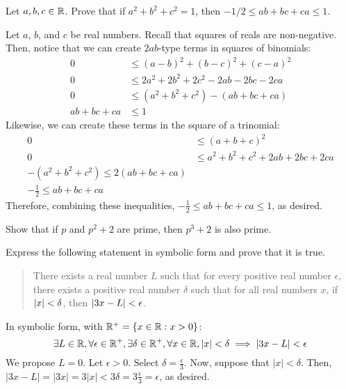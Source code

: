 \begin{challenge}
  Let $a,b,c\in\mathbb{R}$.
  Prove that if $a^2 + b^2 + c^2 = 1$, then $-1/2 \leq ab+bc+ca \leq 1$.
\end{challenge}
\begin{prf}
  Let $a$, $b$, and $c$ be real numbers.
  Recall that squares of reals are non-negative.
  Then, notice that we can create $2ab$-type terms in squares of binomials:
  \begin{align*}
    0            & \leq (a-b)^2 + (b-c)^2 + (c-a)^2          \\
    0            & \leq 2a^2 + 2b^2 + 2c^2 - 2ab - 2bc - 2ca \\
    0            & \leq (a^2 + b^2 + c^2) - (ab + bc + ca)   \\
    ab + bc + ca & \leq 1
  \end{align*}
  Likewise, we can create these terms in the square of a trinomial:
  \begin{align*}
    0 & \leq (a+b+c)^2                         \\
    0 & \leq a^2 + b^2 + c^2 + 2ab + 2bc + 2ca \\
    -(a^2 + b^2 + c^2) \leq 2(ab + bc + ca)    \\
    -\frac{1}{2} \leq ab + bc + ca
  \end{align*}
  Therefore, combining these inequalities, $-\frac{1}{2} \leq ab + bc + ca \leq 1$, as desired.
\end{prf}

\begin{challenge}
  Show that if $p$ and $p^2+2$ are prime, then $p^3+2$ is also prime.
\end{challenge}

\begin{challenge}
  Express the following statement in symbolic form and prove that it is true.
  \begin{quote}
    There exists a real number $L$ such that for every positive real number $\epsilon$,
    there exists a positive real number $\delta$ such that for all real numbers $x$,
    if $\abs{x} < \delta$, then $\abs{3x-L} < \epsilon$.
  \end{quote}
\end{challenge}
\begin{prf}
  In symbolic form, with $\mathbb{R}^+ = \{ x \in \mathbb{R} : x > 0 \}$:
  \[ \exists L\in\mathbb{R}, \forall \epsilon\in\mathbb{R}^+, \exists \delta\in\mathbb{R}^+, \forall x\in\mathbb{R}, |x|<\delta \implies |3x-L| < \epsilon \]
  We propose $L = 0$.
  Let $\epsilon > 0$.
  Select $\delta = \frac{\epsilon}{3}$.
  Now, suppose that $|x| < \delta$.
  Then, $|3x - L| = |3x| = 3|x| < 3\delta = 3\frac{\epsilon}{3} = \epsilon$, as desired.
\end{prf}

